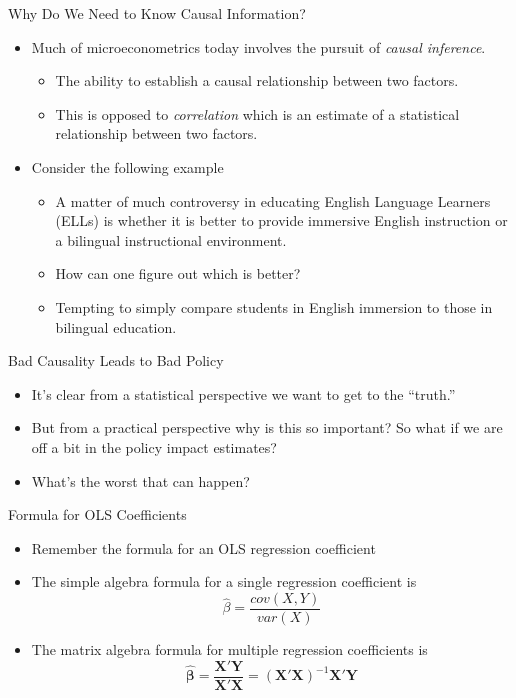\documentclass{beamer}
\newcommand{\bfhat}[1]{\hat{\boldsymbol{#1}}}
\begin{document}
\begin{frame}{Why Do We Need to Know Causal Information?}
    \begin{itemize}
        \item Much of microeconometrics today involves the pursuit of \textit{causal inference}.
        \begin{itemize}
            \item The ability to establish a causal relationship between two factors.
            \item This is opposed to \textit{correlation} which is an estimate of a statistical relationship between two factors.
        \end{itemize}
        \item Consider the following example
            \begin{itemize}
                \item A matter of much controversy in educating English Language Learners (ELLs) is whether it is better to provide immersive English instruction or a bilingual instructional environment.
                \item How can one figure out which is better?
                \item Tempting to simply compare students in English immersion to those in bilingual education.
            \end{itemize}
        \end{itemize}
 \end{frame}

\begin{frame}{Bad Causality Leads to Bad Policy}
\begin{itemize}
    \item It's clear from a statistical perspective we want to get to the ``truth.'' \bigskip
    \item But from a practical perspective why is this so important?  So what if we are off a bit in the policy impact estimates? \bigskip
    \item What's the worst that can happen?
\end{itemize}
\end{frame}

\begin{frame}{Formula for OLS Coefficients}
    \begin{itemize}
        \item Remember the formula for an OLS regression coefficient
 	\item The simple algebra formula for a single regression coefficient is
	        \begin{equation}
            		\hat{\beta} = \frac{cov(X,Y)}{var(X)}
        		\end{equation}
        
        \item The matrix algebra formula for multiple regression coefficients is	
       \begin{equation}
            \bfhat{\beta} = \mathbf{\frac{X'Y}{X'X}} = \left(\mathbf{X'X}\right)^{-1}\mathbf{X'Y}
        \end{equation}
    \end{itemize}
\end{frame}
\end{document}
